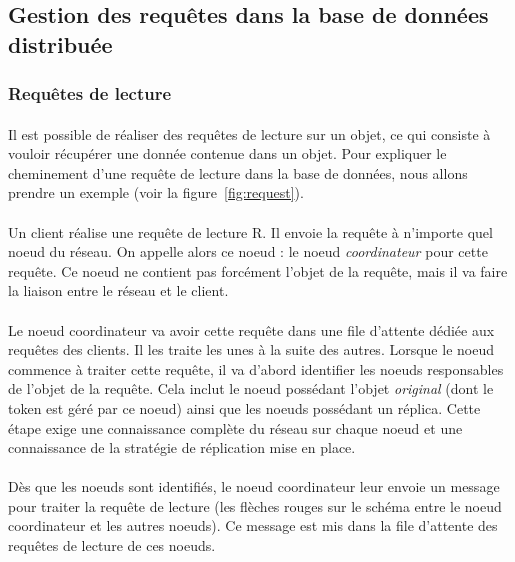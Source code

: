 \documentclass[12pt]{article}
\begin{document}
\subsection{Gestion des requêtes dans la base de données distribuée}
\subsubsection{Requêtes de lecture}

\paragraph{} Il est possible de réaliser des requêtes de lecture sur un objet, ce qui consiste à vouloir récupérer une donnée contenue dans un objet. Pour expliquer le cheminement d'une requête de lecture dans la base de données, nous allons prendre un exemple (voir la figure~\ref{fig:request}).

\paragraph{} Un client réalise une requête de lecture R. Il envoie la requête à n'importe quel noeud du réseau. On appelle alors ce noeud : le noeud \textit{coordinateur} pour cette requête. Ce noeud ne contient pas forcément l'objet de la requête, mais il va faire la liaison entre le réseau et le client.

\paragraph{} Le noeud coordinateur va avoir cette requête dans une file d'attente dédiée aux requêtes des clients. Il les traite les unes à la suite des autres. Lorsque le noeud commence à traiter cette requête, il va d'abord identifier les noeuds responsables de l'objet de la requête. Cela inclut le noeud possédant l'objet \textit{original} (dont le token est géré par ce noeud) ainsi que les noeuds possédant un réplica. Cette étape exige une connaissance complète du réseau sur chaque noeud et une connaissance de la stratégie de réplication mise en place.

\paragraph{} Dès que les noeuds sont identifiés, le noeud coordinateur leur envoie un message pour traiter la requête de lecture (les flèches rouges sur le schéma entre le noeud coordinateur et les autres noeuds). Ce message est mis dans la file d'attente des requêtes de lecture de ces noeuds.
\end{document}
